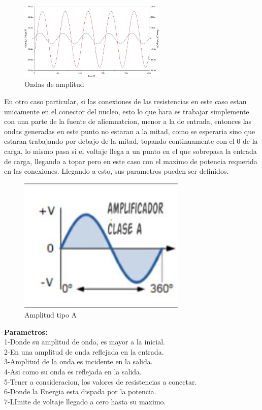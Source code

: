 \documentclass[12pt,a4paper]{article}
\begin{document}
\begin{figure}[hbtp]
\centering
\includegraphics[width=7cm]{4.jpg}
\caption{Ondas de amplitud}
\end{figure}

En otro caso particular, si las conexiones de las resistencias en este caso estan unicamente en el conector del nucleo, esto lo que hara es trabajar simplemente con una parte de la fuente de aliemnatcion, menor a la de entrada, entonces las ondas generadas en este punto no estaran a la mitad, como se esperaria sino que estaran trabajando por debajo de la mitad, topando continuamente con el 0 de la carga, lo mismo pasa si el voltaje llega a un punto en el que sobrepasa la entrada de carga, llegando a topar pero en este caso con el maximo de potencia requerida en las conexiones. Llegando a esto, sus parametros pueden ser definidos.\\

\begin{figure}[hbtp]
\centering
\includegraphics[width=8cm]{3.jpg}
\caption{Amplitud tipo A}
\end{figure}

\textbf{Parametros:}\\
1-Donde su amplitud de onda, es mayor a la inicial.\\
2-En una amplitud de onda reflejada en la entrada.\\
3-Amplitud de la onda es incidente en la salida.\\
4-Asi como su onda es reflejada en la salida.\\
5-Tener a consideracion, los valores de resistencias a conectar.\\
6-Donde la Energia esta dispada por la potencia.\\
7-LImite de voltaje llegado a cero hasta su maximo.\\
\end{document}

